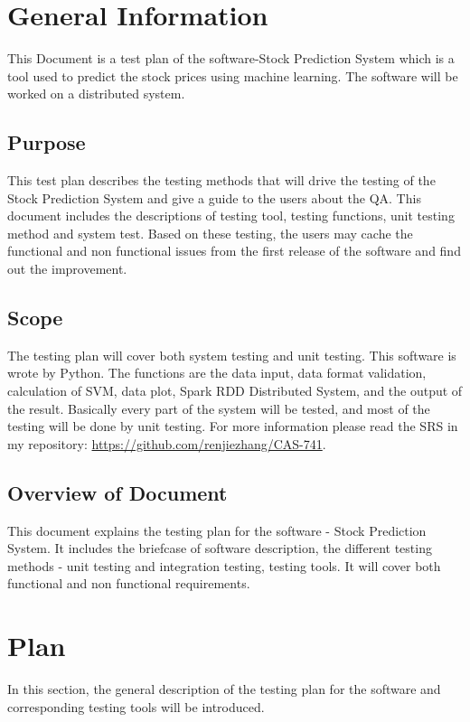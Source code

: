 \documentclass[12pt, titlepage]{article}
\begin{document}
\section{General Information}
This Document is a test plan of the software-Stock Prediction System which is a tool used to predict the stock prices using machine learning. The software will be worked on a distributed system.

\subsection{Purpose}

This test plan describes the testing methods that will drive the testing of the
Stock Prediction System and give a guide to the users about the QA. This
document includes the descriptions of testing tool, testing functions, unit
testing method and system test. Based on these testing, the users may cache the
functional and non functional issues from the first release of the software and
find out the improvement.

\subsection{Scope}

The testing plan will cover both system testing and unit testing. This software is wrote by Python. The functions
are the data input, data format validation, calculation of SVM, data plot, Spark
RDD Distributed System, and the output of the result. Basically every part of
the system will be tested, and most of the testing will be done by unit testing.
For more information please read the SRS in my repository: 
\url{https://github.com/renjiezhang/CAS-741}.\\


\subsection{Overview of Document}
This document explains the testing plan for the software - Stock Prediction
System. It includes the briefcase of software description, the different testing
methods - unit testing and integration testing, testing tools. It will cover
both functional and non functional requirements.
\section{Plan}
In this section, the general description of the testing plan for the software and corresponding testing tools will be introduced.
\end{document}
